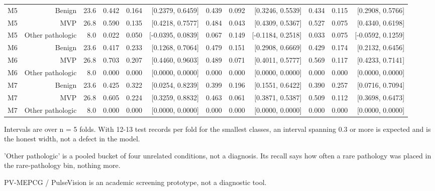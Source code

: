 \begin{table}[htbp]
\begin{tabular}{lrrrrrrrrrrr}
    M5 & Benign & 23.6 & 0.442 & 0.164 & [0.2379, 0.6459] & 0.439 & 0.092 & [0.3246, 0.5539] & 0.434 & 0.115 & [0.2908, 0.5766] \\
    M5 & MVP & 26.8 & 0.590 & 0.135 & [0.4218, 0.7577] & 0.484 & 0.043 & [0.4309, 0.5367] & 0.527 & 0.075 & [0.4340, 0.6198] \\
    M5 & Other pathologic & 8.0 & 0.022 & 0.050 & [-0.0395, 0.0839] & 0.067 & 0.149 & [-0.1184, 0.2518] & 0.033 & 0.075 & [-0.0592, 0.1259] \\
    M6 & Benign & 23.6 & 0.417 & 0.233 & [0.1268, 0.7064] & 0.479 & 0.151 & [0.2908, 0.6669] & 0.429 & 0.174 & [0.2132, 0.6456] \\
    M6 & MVP & 26.8 & 0.703 & 0.207 & [0.4460, 0.9603] & 0.489 & 0.071 & [0.4011, 0.5777] & 0.569 & 0.117 & [0.4233, 0.7141] \\
    M6 & Other pathologic & 8.0 & 0.000 & 0.000 & [0.0000, 0.0000] & 0.000 & 0.000 & [0.0000, 0.0000] & 0.000 & 0.000 & [0.0000, 0.0000] \\
    M7 & Benign & 23.6 & 0.425 & 0.322 & [0.0254, 0.8239] & 0.399 & 0.196 & [0.1551, 0.6422] & 0.390 & 0.257 & [0.0716, 0.7094] \\
    M7 & MVP & 26.8 & 0.605 & 0.224 & [0.3259, 0.8832] & 0.463 & 0.061 & [0.3871, 0.5387] & 0.509 & 0.112 & [0.3698, 0.6473] \\
    M7 & Other pathologic & 8.0 & 0.000 & 0.000 & [0.0000, 0.0000] & 0.000 & 0.000 & [0.0000, 0.0000] & 0.000 & 0.000 & [0.0000, 0.0000] \\
    \bottomrule
  \end{tabular}
  \par\footnotesize Intervals are over n = 5 folds. With 12-13 test records per fold for the smallest classes, an interval spanning 0.3 or more is expected and is the honest width, not a defect in the model.
  \par\footnotesize 'Other pathologic' is a pooled bucket of four unrelated conditions, not a diagnosis. Its recall says how often a rare pathology was placed in the rare-pathology bin, nothing more.
  \par\footnotesize PV-MEPCG / PulseVision is an academic screening prototype, not a diagnostic tool.
\end{table}
